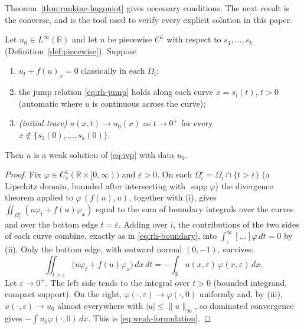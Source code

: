 Theorem~\ref{thm:rankine-hugoniot} gives necessary conditions. The next
result is the converse, and is the tool used to verify every explicit
solution in this paper.

\begin{proposition}
\label{prop:piecewise-weak}
Let $u_0\in L^\infty(\mathbb{R})$ and let $u$ be piecewise $C^1$ with
respect to $s_1,\dots,s_k$ (Definition~\ref{def:piecewise}). Suppose
\begin{enumerate}
  \item[\textup{(i)}] $u_t+f(u)_x=0$ classically in each $\Omega_i$;
  \item[\textup{(ii)}] the jump relation \eqref{eq:rh-jump} holds along
    each curve $x=s_i(t)$, $t>0$ (automatic where $u$ is continuous
    across the curve);
  \item[\textup{(iii)}] \emph{(initial trace)} $u(x,t)\to u_0(x)$ as
    $t\to0^+$ for every $x\notin\{s_1(0),\dots,s_k(0)\}$.
\end{enumerate}
Then $u$ is a weak solution of \eqref{eq:ivp} with data $u_0$.
\end{proposition}

\begin{proof}
Fix $\varphi\in C_c^1(\mathbb{R}\times[0,\infty))$ and $\varepsilon>0$. On
each $\Omega_i^\varepsilon=\Omega_i\cap\{t>\varepsilon\}$ (a Lipschitz
domain, bounded after intersecting with $\operatorname{supp}\varphi$) the
divergence theorem applied to $\varphi\,(f(u),u)$, together with (i),
gives $\iint_{\Omega_i^\varepsilon}(u\varphi_t+f(u)\varphi_x)$ equal to
the sum of boundary integrals over the curves and over the bottom edge
$t=\varepsilon$. Adding over $i$, the contributions of the two sides of
each curve combine, exactly as in \eqref{eq:rh-boundary}, into
$\int_\varepsilon^\infty[\dots]\varphi\,dt=0$ by (ii). Only the bottom
edge, with outward normal $(0,-1)$, survives:
\begin{equation*}
  \iint_{t>\varepsilon}\big(u\varphi_t+f(u)\varphi_x\big)\,dx\,dt
  = -\int_{\mathbb{R}} u(x,\varepsilon)\,\varphi(x,\varepsilon)\,dx .
\end{equation*}
Let $\varepsilon\to0^+$. The left side tends to the integral over
$t>0$ (bounded integrand, compact support). On the right,
$\varphi(\cdot,\varepsilon)\to\varphi(\cdot,0)$ uniformly and, by (iii),
$u(\cdot,\varepsilon)\to u_0$ almost everywhere with $|u|\le\|u\|_\infty$,
so dominated convergence gives $-\int u_0\varphi(\cdot,0)\,dx$. This is
\eqref{eq:weak-formulation}.
\end{proof}

